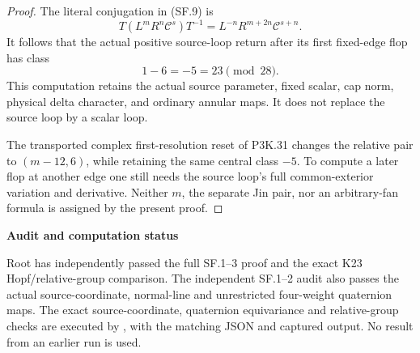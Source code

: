 \begin{proof}
The literal conjugation in (SF.9) is
\[
 T(L^mR^n\mathcal C^s)T^{-1}
       =L^{-n}R^{m+2n}\mathcal C^{s+n}.                   \tag{SF.11}
\]
It follows that the actual positive source-loop return after its
first fixed-edge flop has class
\[
                          1-6=-5=23\pmod {28}.           \tag{SF.12}
\]
This computation retains the actual source parameter, fixed scalar,
cap norm, physical delta character, and ordinary annular maps. It
does not replace the source loop by a scalar loop.

The transported complex first-resolution reset of P3K.31 changes the
relative pair to \((m-12,6)\), while retaining the same central class
\(-5\). To compute a later flop at another edge one still needs the
source loop's full common-exterior variation and derivative. Neither
\(m\), the separate Jin pair, nor an arbitrary-fan formula is assigned
by the present proof.
\end{proof}
\par

\medskip\noindent\textbf{Audit and computation status}

\par\nobreak

Root has independently passed the full SF.1--3 proof and the exact
K23 Hopf/relative-group comparison. The independent SF.1--2 audit also
passes the actual source-coordinate, normal-line and unrestricted
four-weight quaternion maps. The exact
source-coordinate, quaternion equivariance and relative-group checks
are executed by , with the matching
JSON and captured output. No result from an earlier run is used.
